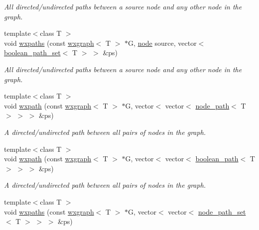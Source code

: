 \begin{DoxyCompactItemize}
\begin{DoxyCompactList}\small\item\em All directed/undirected paths between a source node and any other node in the graph. \end{DoxyCompactList}\item 
{\footnotesize template$<$class T $>$ }\\void \hyperlink{namespacelgraph_1_1traversal_a93c3d0fc761980ddfc4e8235279e9601}{wxpaths} (const \hyperlink{classlgraph_1_1utils_1_1wxgraph}{wxgraph}$<$ T $>$ $\ast$G, \hyperlink{namespacelgraph_1_1utils_a7bd66ede3805ef121bc2835bd48de0cf}{node} source, vector$<$ \hyperlink{namespacelgraph_1_1utils_aaf50131e15d771a45620336d6e7a77f8}{boolean\+\_\+path\+\_\+set}$<$ T $>$ $>$ \&ps)
\begin{DoxyCompactList}\small\item\em All directed/undirected paths between a source node and any other node in the graph. \end{DoxyCompactList}\item 
{\footnotesize template$<$class T $>$ }\\void \hyperlink{namespacelgraph_1_1traversal_a52e87298a02bf95e82074041bd459446}{wxpath} (const \hyperlink{classlgraph_1_1utils_1_1wxgraph}{wxgraph}$<$ T $>$ $\ast$G, vector$<$ vector$<$ \hyperlink{classlgraph_1_1utils_1_1node__path}{node\+\_\+path}$<$ T $>$ $>$ $>$ \&ps)
\begin{DoxyCompactList}\small\item\em A directed/undirected path between all pairs of nodes in the graph. \end{DoxyCompactList}\item 
{\footnotesize template$<$class T $>$ }\\void \hyperlink{namespacelgraph_1_1traversal_a69cf3d811b6f551c765d5a2cce69b3b2}{wxpath} (const \hyperlink{classlgraph_1_1utils_1_1wxgraph}{wxgraph}$<$ T $>$ $\ast$G, vector$<$ vector$<$ \hyperlink{classlgraph_1_1utils_1_1boolean__path}{boolean\+\_\+path}$<$ T $>$ $>$ $>$ \&ps)
\begin{DoxyCompactList}\small\item\em A directed/undirected path between all pairs of nodes in the graph. \end{DoxyCompactList}\item 
{\footnotesize template$<$class T $>$ }\\void \hyperlink{namespacelgraph_1_1traversal_a8901a21aa64dadd3483606b4c047e6a1}{wxpaths} (const \hyperlink{classlgraph_1_1utils_1_1wxgraph}{wxgraph}$<$ T $>$ $\ast$G, vector$<$ vector$<$ \hyperlink{namespacelgraph_1_1utils_a723c115f9865edfab11a90377b9abef4}{node\+\_\+path\+\_\+set}$<$ T $>$ $>$ $>$ \&ps)

\end{DoxyCompactItemize}
